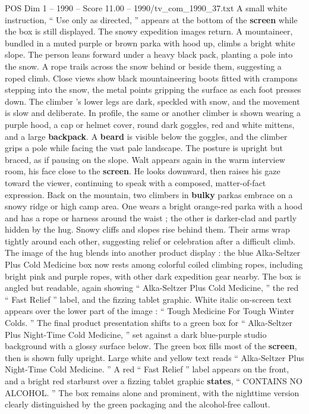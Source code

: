 \begin{textsample}{POS Dim 1 – 1990 – Score 11.00 – 1990/tv\_com\_1990\_37.txt}
A small white instruction, “ Use only as directed, ” appears at the bottom of the \textbf{screen} while the box is still displayed.
The snowy expedition images return.
A mountaineer, bundled in a muted purple or brown parka with hood up, climbs a bright white slope.
The person leans forward under a heavy black pack, planting a pole into the snow.
A rope trails across the snow behind or beside them, suggesting a roped climb.
Close views show black mountaineering boots fitted with crampons stepping into the snow, the metal points gripping the surface as each foot presses down.
The climber ’s lower legs are dark, speckled with snow, and the movement is slow and deliberate.
In profile, the same or another climber is shown wearing a purple hood, a cap or helmet cover, round dark goggles, red and white mittens, and a large \textbf{backpack}.
A \textbf{beard} is visible below the goggles, and the climber grips a pole while facing the vast pale landscape.
The posture is upright but braced, as if pausing on the slope.
Walt appears again in the warm interview room, his face close to the \textbf{screen}.
He looks downward, then raises his gaze toward the viewer, continuing to speak with a composed, matter-of-fact expression.
Back on the mountain, two climbers in \textbf{bulky} parkas embrace on a snowy ridge or high camp area.
One wears a bright orange-red parka with a hood and has a rope or harness around the waist ; the other is darker-clad and partly hidden by the hug.
Snowy cliffs and slopes rise behind them.
Their arms wrap tightly around each other, suggesting relief or celebration after a difficult climb.
The image of the hug blends into another product display : the blue Alka-Seltzer Plus Cold Medicine box now rests among colorful coiled climbing ropes, including bright pink and purple ropes, with other dark expedition gear nearby.
The box is angled but readable, again showing “ Alka-Seltzer Plus Cold Medicine, ” the red “ Fast Relief ” label, and the fizzing tablet graphic.
White italic on-screen text appears over the lower part of the image : “ Tough Medicine For Tough Winter Colds. ” The final product presentation shifts to a green box for “ Alka-Seltzer Plus Night-Time Cold Medicine, ” set against a dark blue-purple studio background with a glossy surface below.
The green box fills most of the \textbf{screen}, then is shown fully upright.
Large white and yellow text reads “ Alka-Seltzer Plus Night-Time Cold Medicine. ” A red “ Fast Relief ” label appears on the front, and a bright red starburst over a fizzing tablet graphic \textbf{states}, “ CONTAINS NO ALCOHOL. ” The box remains alone and prominent, with the nighttime version clearly distinguished by the green packaging and the alcohol-free callout.

\end{textsample}
